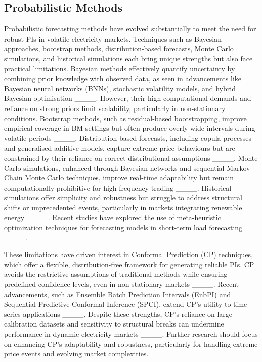\subsection{Probabilistic Methods}
Probabilistic forecasting methods have evolved substantially to meet the need for robust PIs in volatile electricity markets. Techniques such as Bayesian approaches, bootstrap methods, distribution-based forecasts, Monte Carlo simulations, and historical simulations each bring unique strengths but also face practical limitations. Bayesian methods effectively quantify uncertainty by combining prior knowledge with observed data, as seen in advancements like Bayesian neural networks (BNNs), stochastic volatility models, and hybrid Bayesian optimisation ____. However, their high computational demands and reliance on strong priors limit scalability, particularly in non-stationary conditions. Bootstrap methods, such as residual-based bootstrapping, improve empirical coverage in BM settings but often produce overly wide intervals during volatile periods ____. Distribution-based forecasts, including copula processes and generalised additive models, capture extreme price behaviours but are constrained by their reliance on correct distributional assumptions ____. Monte Carlo simulations, enhanced through Bayesian networks and sequential Markov Chain Monte Carlo techniques, improve real-time adaptability but remain computationally prohibitive for high-frequency trading ____. Historical simulations offer simplicity and robustness but struggle to address structural shifts or unprecedented events, particularly in markets integrating renewable energy ____. Recent studies have explored the use of meta-heuristic optimization techniques for forecasting models in short-term load forecasting ____.

These limitations have driven interest in Conformal Prediction (CP) techniques, which offer a flexible, distribution-free framework for generating reliable PIs. CP avoids the restrictive assumptions of traditional methods while ensuring predefined confidence levels, even in non-stationary markets ____. Recent advancements, such as Ensemble Batch Prediction Intervals (EnbPI) and Sequential Predictive Conformal Inference (SPCI), extend CP’s utility to time-series applications ____. Despite these strengths, CP’s reliance on large calibration datasets and sensitivity to structural breaks can undermine performance in dynamic electricity markets ____. Further research should focus on enhancing CP’s adaptability and robustness, particularly for handling extreme price events and evolving market complexities.



